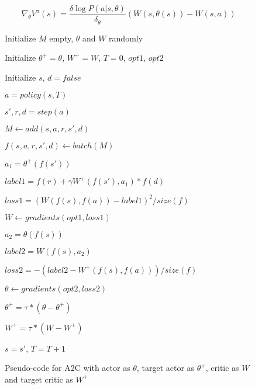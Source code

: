\documentclass[journal]{IEEEtran}
\begin{document}
		\begin{equation} \label{eq:actorA2C}
			\nabla_\theta V^\pi(s) = \frac{\delta \log P(a|s, \theta)}{\delta_\theta} (W(s, \theta(s)) - W(s,a))
		\end{equation}

		\begin{figure}
			\begin{algorithmic}[h]
			
				\STATE Initialize $M$ empty, $\theta$ and $W$ randomly
				
				\STATE Initialize $\theta^+ = \theta$, $W^+ = W$, $T = 0$, $opt1$, $opt2$	
			
			
					\STATE Initialize $s$, $d = false$
				
					
						\STATE $a = policy (s, T)$
						
						\STATE $s', r, d = step (a)$
					
						\STATE $M \leftarrow add(s,a,r,s',d)$
						
						\STATE $f(s,a,r,s',d) \leftarrow batch(M)$
						
						\STATE $a_1 = \theta^+(f(s'))$
						
						\STATE $label1 = f(r) + \gamma W^+(f(s'),a_1) * f(d)$
						
						\STATE $loss1 = (W(f(s),f(a)) - label1)^2/size(f)$
						
						\STATE $W \leftarrow gradients(opt1, loss1)$
						
						\STATE $a_2 = \theta(f(s))$
						
						\STATE $label2 = W(f(s),a_2)$
						
						\STATE $loss2 = -(label2 - W^+(f(s),f(a)))/size(f)$
						
						\STATE $\theta \leftarrow gradients(opt2, loss2)$
						
						\STATE $\theta^+ = \tau * (\theta - \theta^+)$
						
						\STATE $W^+ = \tau * (W - W^+)$		
						
						\STATE $s = s'$, $T = T+1$

					\ENDWHILE
				\ENDFOR		
			
			\end{algorithmic}
			\caption{Pseudo-code for A2C with actor as $\theta$, target actor as $\theta^+$, critic as $W$ and target critic as $W^+$}
			\label{alg:A2C code}
		\end{figure}
		
\end{document}
